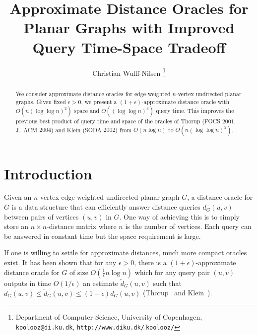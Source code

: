 \documentclass[11pt]{article}
\begin{document}
\title{Approximate Distance Oracles for Planar Graphs with Improved Query Time-Space Tradeoff}
\author{Christian Wulff-Nilsen
        \footnote{Department of Computer Science,
                  University of Copenhagen,
                  \texttt{koolooz@di.ku.dk},
                  \texttt{http://www.diku.dk/$_{\widetilde{~}}$koolooz/}}}

\date{}

\maketitle
\begin{abstract}
We consider approximate distance oracles for edge-weighted $n$-vertex undirected planar graphs. Given fixed $\epsilon > 0$, we present a $(1+\epsilon)$-approximate distance oracle with $O(n(\log\log n)^2)$ space and $O((\log\log n)^3)$ query time. This improves the previous best product of query time and space of the oracles of Thorup (FOCS $2001$, J.~ACM $2004$) and Klein (SODA $2002$) from $O(n\log n)$ to $O(n(\log\log n)^5)$.
\end{abstract}

\section{Introduction}\label{sec:Intro}
Given an $n$-vertex edge-weighted undirected planar graph $G$, a distance oracle for $G$ is a data structure that can efficiently answer distance queries $d_G(u,v)$ between pairs of vertices $(u,v)$ in $G$. One way of achieving this is to simply store an $n\times n$-distance matrix where $n$ is the number of vertices. Each query can be answered in constant time but the space requirement is large.

If one is willing to settle for approximate distances, much more compact oracles exist. It has been shown that for any $\epsilon > 0$, there is a $(1+\epsilon)$-approximate distance oracle for $G$ of size $O(\frac 1\epsilon n\log n)$ which for any query pair $(u,v)$ outputs in time $O(1/\epsilon)$ an estimate $\tilde{d}_G(u,v)$ such that $d_G(u,v)\leq\tilde{d}_G(u,v)\leq(1+\epsilon)d_G(u,v)$ (Thorup~\cite{OraclePlanarThorup} and Klein~\cite{OraclePlanarKlein}).
\end{document}
